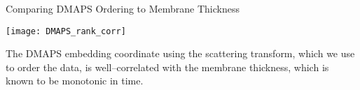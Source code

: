 \begin{frame}{Comparing DMAPS Ordering to Membrane Thickness}

	\centering
	\texttt{[image: DMAPS\_rank\_corr]}	
	
	The DMAPS embedding coordinate using the scattering transform, which we use to order the data, is well--correlated with the membrane thickness, which is known to be monotonic in time.
	
\end{frame}
